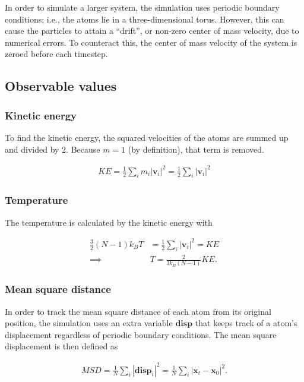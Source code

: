 \documentclass[twocolumn]{revtex4}
\begin{document}
In order to simulate a larger system, the simulation uses periodic boundary conditions; i.e., the atoms lie in a three-dimensional torus. However, this can cause the particles to attain a ``drift'', or non-zero center of mass velocity, due to numerical errors. To counteract this, the center of mass velocity of the system is zeroed before each timestep.

\subsection{Observable values}

\subsubsection{Kinetic energy}

To find the kinetic energy, the squared velocities of the atoms are summed up and divided by 2. Because $m=1$ (by definition), that term is removed.

\begin{align}
KE = \frac{1}{2} \sum_i m_i |\mathbf{v}_i|^2 = \frac{1}{2} \sum_i |\mathbf{v}_i|^2
\end{align}

\subsubsection{Temperature}

The temperature is calculated by the kinetic energy with

\begin{align}
\frac{3}{2} (N-1) k_B T &= \frac{1}{2} \sum_i |\mathbf{v}_i|^2 = KE\\
\implies & T = \frac{2}{3 k_B (N-1)} KE.
\end{align}

\subsubsection{Mean square distance}

In order to track the mean square distance of each atom from its original position, the simulation uses an extra variable $\mathbf{disp}$ that keeps track of a atom's displacement regardless of periodic boundary conditions. The mean square displacement is then defined as

\begin{align}
MSD = \frac{1}{N} \sum_i |\mathbf{disp}_i|^2 = \frac{1}{N} \sum_i |\mathbf{x}_t - \mathbf{x}_0|^2.
\end{align}
\end{document}
